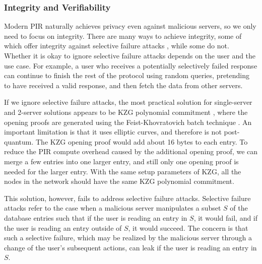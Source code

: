 \subsubsection{Integrity and Verifiability}

Modern PIR naturally achieves privacy even against malicious servers, so we only need to focus on integrity. There are many ways to achieve integrity, some of which offer integrity against selective failure attacks \cite{kilian88,naor99,dwork99,camenisch07,lindell11,kiraz06}, while some do not. Whether it is okay to ignore selective failure attacks depends on the user and the use case. For example, a user who receives a potentially selectively failed response can continue to finish the rest of the protocol using random queries, pretending to have received a valid response, and then fetch the data from other servers.

If we ignore selective failure attacks, the most practical solution for single-server and 2-server solutions appears to be KZG polynomial commitment \cite{kzg10}, where the opening proofs are generated using the Feist-Khovratovich batch technique \cite{fk23}. An important limitation is that it uses elliptic curves, and therefore is not post-quantum. The KZG opening proof would add about 16 bytes to each entry. To reduce the PIR compute overhead caused by the additional opening proof, we can merge a few entries into one larger entry, and still only one opening proof is needed for the larger entry. With the same setup parameters of KZG, all the nodes in the network should have the same KZG polynomial commitment.

This solution, however, fails to address selective failure attacks. Selective failure attacks refer to the case when a malicious server manipulates a subset $S$ of the database entries such that if the user is reading an entry in $S$, it would fail, and if the user is reading an entry outside of $S$, it would succeed. The concern is that such a selective failure, which may be realized by the malicious server through a change of the user's subsequent actions, can leak if the user is reading an entry in $S$.

